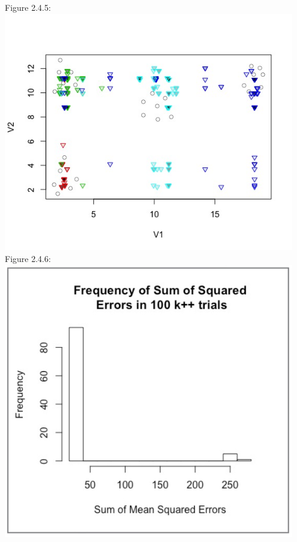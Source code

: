 \documentclass[12pt]{article}
\begin{document}
\begin{center}
  Figure 2.4.5:\\
  \includegraphics[width=5in]{plots/km_plot5.jpeg}\\

  Figure 2.4.6:\\
  \includegraphics[width=5in]{plots/km_plot6.jpeg}\\


\end{center}
\end{document}
